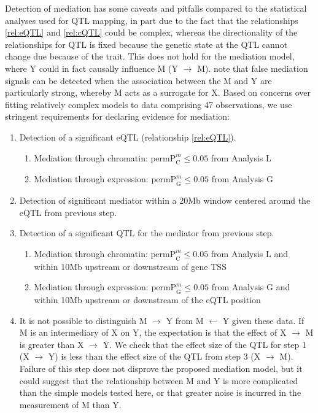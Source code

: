 \documentclass[9pt,twocolumn,twoside]{gsajnl}
\newcommand{\permpmed}{\text{permP}^{m}}
\begin{document}
Detection of mediation has some caveats and pitfalls compared to the statistical analyses used for QTL mapping, in part due to the fact that the relationships \ref{rel:eQTL} and \ref{rel:cQTL} could be complex, whereas the directionality of the relationships for QTL is fixed because the genetic state at the QTL cannot change due because of the trait. This does not hold for the mediation model, where Y could in fact causally influence M (Y $\rightarrow$ M). \cite{Didelez2007} note that false mediation signals can be detected when the association between the M and Y are particularly strong, whereby M acts as a surrogate for X. Based on concerns over fitting relatively complex models to data comprising 47 observations, we use stringent requirements for declaring evidence for mediation:
\begin{enumerate}
	\item Detection of a significant eQTL (relationship \ref{rel:eQTL}).
    \begin{enumerate}
    	\item Mediation through chromatin: $\permpmed_{\text{C}} \leq 0.05$ from Analysis L
        \item Mediation through expression: $\permpmed_{\text{G}} \leq 0.05$ from Analysis G
    \end{enumerate}
    \item Detection of significant mediator within a 20Mb window centered around the eQTL from previous step.
    \item Detection of a significant QTL for the mediator from previous step.
    \begin{enumerate}
    	\item Mediation through chromatin: $\permpmed_{\text{C}} \leq 0.05$ from Analysis L and within 10Mb upstream or downstream of gene TSS
        \item Mediation through expression: $\permpmed_{\text{G}} \leq 0.05$ from Analysis G and within 10Mb upstream or downstream of the eQTL position
    \end{enumerate}
    \item It is not possible to distinguish M $\rightarrow$ Y from M $\leftarrow$ Y given these data. If M is an intermediary of X on Y, the expectation is that the effect of X $\rightarrow$ M is greater than X $\rightarrow$ Y. We check that the effect size of the QTL for step 1 (X $\rightarrow$ Y) is less than the effect size of the QTL from step 3 (X $\rightarrow$ M). Failure of this step does not disprove the proposed mediation model, but it could suggest that the relationship between M and Y is more complicated than the simple models tested here, or that greater noise is incurred in the measurement of M than Y.
\end{enumerate}
\end{document}
